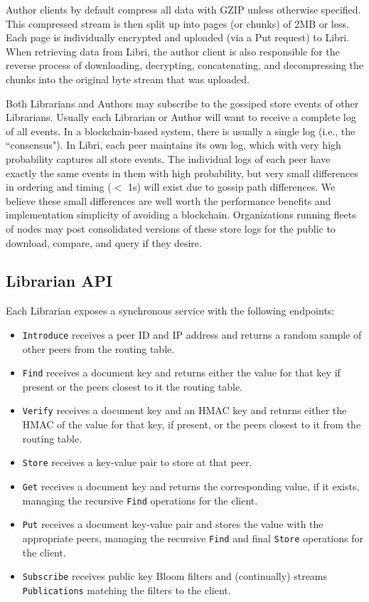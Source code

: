\documentclass[10pt]{article}
\newcommand{\ttt}[1]{\texttt{#1}}
\begin{document}
Author clients by default compress all data with GZIP unless otherwise specified. This compressed stream is then split up into pages (or chunks) of 2MB or less. Each page is individually encrypted and uploaded (via a Put request) to Libri. When retrieving data from Libri, the author client is also responsible for the reverse process of downloading, decrypting, concatenating, and decompressing the chunks into the original byte stream that was uploaded.

Both Librarians and Authors may subscribe to the gossiped store events of other Librarians. Usually each Librarian or Author will want to receive a complete log of all events. In a blockchain-based system, there is usually a single log (i.e., the ``consensus"). In Libri, each peer maintains its own log, which with very high probability captures all store events. The individual logs of each peer have exactly the same events in them with high probability, but very small differences in ordering and timing ($<$ 1s) will exist due to gossip path differences. We believe these small differences are well worth the performance benefits and implementation simplicity of avoiding a blockchain. Organizations running fleets of nodes may post consolidated versions of these store logs for the public to download, compare, and query if they desire.

\subsection{Librarian API}
\label{sec:API}
Each Librarian exposes a synchronous service with the following endpoints:
\begin{itemize}
	\item \ttt{Introduce} receives a peer ID and IP address and returns a random sample of other peers from the routing table.
	\item \ttt{Find} receives a document key and returns either the value for that key if present or the peers closest to it the routing table.
	\item \ttt{Verify} receives a document key and an HMAC key and returns either the HMAC of the value for that key, if present, or the peers closest to it from the routing table.
	\item \ttt{Store} receives a key-value pair to store at that peer.
	\item \ttt{Get} receives a document key and returns the corresponding value, if it exists, managing the recursive \texttt{Find} operations for the client.
	\item \ttt{Put} receives a document key-value pair and stores the value with the appropriate peers, managing the recursive \texttt{Find} and final \ttt{Store} operations for the client.
	\item \ttt{Subscribe} receives public key Bloom filters and (continually) streams \ttt{Publications} matching the filters to the client.
\end{itemize}
\end{document}
